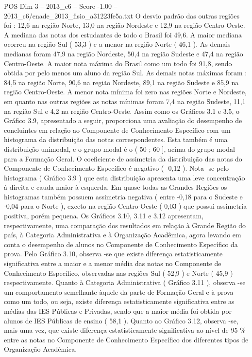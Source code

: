 \begin{textsample}{POS Dim 3 – 2013\_c6 – Score -1.00 – 2013\_c6/enade\_2013\_fisio\_a31223fe5a.txt}
O desvio padrão das outras regiões foi : 12,6 na região Norte, 13,0 na região Nordeste e 12,9 na região Centro-Oeste.
A mediana das notas dos estudantes de todo o Brasil foi 49,6.
A maior mediana ocorreu na região Sul ( 53,3 ) e a menor na região Norte ( 46,1 ).
As demais medianas foram 47,9 na região Nordeste, 50,4 na região Sudeste e 47,4 na região Centro-Oeste.
A maior nota máxima do Brasil como um todo foi 91,8, sendo obtida por pelo menos um aluno da região Sul.
As demais notas máximas foram : 84,5 na região Norte, 90,6 na região Nordeste, 89,1 na região Sudeste e 85,9 na região Centro-Oeste.
A menor nota mínima foi zero nas regiões Norte e Nordeste, em quanto nas outras regiões as notas mínimas foram 7,4 na região Sudeste, 11,1 na região Sul e 4,2 na região Centro-Oeste.
Assim como os Gráficos 3.1 e 3.5, o Gráfico 3.9, apresentado a seguir, proporciona uma avaliação do desempenho de concluintes em relação ao Componente de Conhecimento Específico com um histograma da distribuição das notas correspondentes.
Esta também é uma distribuição unimodal, e o grupo modal é o ( 50 ; 60 ], acima do grupo modal para a Formação Geral.
O coeficiente de assimetria da distribuição das notas do Componente de Conhecimento Específico é negativo ( -0,12 ).
Nota -se pelo histograma ( Gráfico 3.9 ) que esta distribuição apresenta uma leve concentração à direita e cauda maior à esquerda.
Em quase todas as Grandes Regiões os histogramas também possuem assimetria negativa ( entre -0,18 para o Sudeste e -0,04 para o Norte ), exceto na região Centro-Oeste ( 0,03 ) que possui assimetria positiva, porém pequena.
Os Gráficos 3.10, 3.11 e 3.12 apresentam, respectivamente, uma comparação dos resultados em relação à Grande Região do país, à Categoria Administrativa e à Organização Acadêmica, agora levando em conta o desempenho de alunos no Componente de Conhecimento Específico da prova.
Pelo Gráfico 3.10, observa -se que existe diferença estatisticamente significativa entre a maior e a menor média das notas no Componente de Conhecimento Específico, observadas nas regiões Sul ( 52,9 ) e Norte ( 45,9 ) respectivamente.
Quanto à Categoria Administrativa ( Gráfico 3.11 ), observa -se um comportamento semelhante àquele da parte de Formação Geral e à prova como um todo, ou seja, existe diferença estatisticamente significativa entre as médias das IES Públicas e Privadas, sendo que a maior média foi obtida por alunos de IES Públicas de ensino ( 58,1 ).
Quanto ao Gráfico 3.12, observa -se, mais uma vez, que existe diferença estatisticamente significativa ao nível de 95 \% entre as notas no Componente de Conhecimento Específico dos diferentes tipos de Organização Acadêmica.

\end{textsample}
